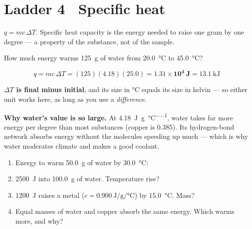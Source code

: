 \documentclass{apchem-worksheet}
\begin{document}
\section*{\sffamily Ladder 4 \textbullet\ Specific heat}

$q = mc\,\Delta T$. Specific heat capacity is the energy needed to raise
one gram by one degree --- a property of the substance, not of the sample.

\begin{workedexample}
How much energy warms \SI{125}{\gram} of water from \SI{20.0}{\celsius}
to \SI{45.0}{\celsius}?

\[ q = mc\,\Delta T = (125)(4.18)(25.0) = \mathbf{1.31\times10^{4}~J}
   = \SI{13.1}{\kilo\joule} \]

\textbf{$\Delta T$ is final minus initial}, and its size in
\si{\celsius} equals its size in kelvin --- so either unit works here, as
long as you use a \emph{difference}.

\textbf{Why water's value is so large.} At
\SI{4.18}{\joule\per\gram\per\celsius}, water takes far more energy per
degree than most substances (copper is \num{0.385}). Its hydrogen-bond
network absorbs energy without the molecules speeding up much --- which is
why water moderates climate and makes a good coolant.
\end{workedexample}

\begin{yourturn}
\begin{enumerate}[leftmargin=*,itemsep=0.5em]
  \item Energy to warm \SI{50.0}{\gram} of water by
        \SI{30.0}{\celsius}: \workspace[1.6cm]
  \item \SI{2500}{\joule} into \SI{100.0}{\gram} of water. Temperature
        rise? \workspace[1.6cm]
  \item \SI{1200}{\joule} raises a metal
        ($c = \SI{0.900}{\joule\per\gram\per\celsius}$) by
        \SI{15.0}{\celsius}. Mass? \workspace[1.8cm]
  \item Equal masses of water and copper absorb the same energy. Which
        warms more, and why? \workspace[1.8cm]
\end{enumerate}
\end{yourturn}
\end{document}
